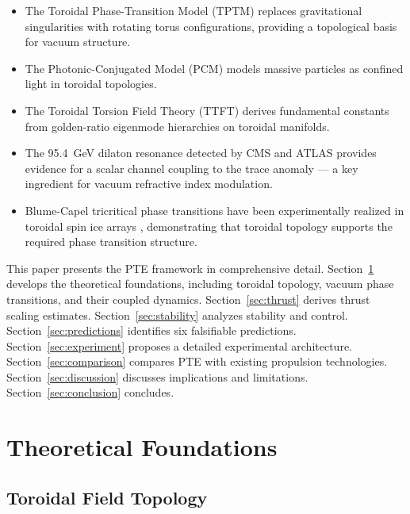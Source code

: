 \documentclass[12pt,a4paper]{article}
\begin{document}
\begin{itemize}
    \item The Toroidal Phase-Transition Model (TPTM) \cite{weinstock2026} replaces gravitational singularities with rotating torus configurations, providing a topological basis for vacuum structure.
    \item The Photonic-Conjugated Model (PCM) \cite{caputo2025} models massive particles as confined light in toroidal topologies.
    \item The Toroidal Torsion Field Theory (TTFT) \cite{zero2025} derives fundamental constants from golden-ratio eigenmode hierarchies on toroidal manifolds.
    \item The 95.4~GeV dilaton resonance detected by CMS and ATLAS \cite{cms2025,atlas2025,hofseth2026} provides evidence for a scalar channel coupling to the trace anomaly --- a key ingredient for vacuum refractive index modulation.
    \item Blume-Capel tricritical phase transitions have been experimentally realized in toroidal spin ice arrays \cite{blume2025}, demonstrating that toroidal topology supports the required phase transition structure.
\end{itemize}

This paper presents the PTE framework in comprehensive detail. Section~\ref{sec:theory} develops the theoretical foundations, including toroidal topology, vacuum phase transitions, and their coupled dynamics. Section~\ref{sec:thrust} derives thrust scaling estimates. Section~\ref{sec:stability} analyzes stability and control. Section~\ref{sec:predictions} identifies six falsifiable predictions. Section~\ref{sec:experiment} proposes a detailed experimental architecture. Section~\ref{sec:comparison} compares PTE with existing propulsion technologies. Section~\ref{sec:discussion} discusses implications and limitations. Section~\ref{sec:conclusion} concludes.

\section{Theoretical Foundations}
\label{sec:theory}

\subsection{Toroidal Field Topology}
\label{sec:toroidal}
\end{document}
